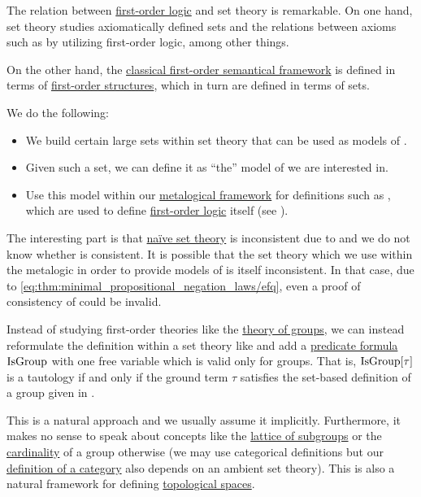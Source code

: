 \begin{remark}\label{rem:set_definition_recursion}
  The relation between \hyperref[subsec:first_order_logic]{first-order logic} and set theory is remarkable. On one hand, set theory studies axiomatically defined sets and the relations between axioms such as \hyperref[def:zfc]{} by utilizing first-order logic, among other things.

  On the other hand, the \hyperref[def:first_order_semantics]{classical first-order semantical framework} is defined in terms of \hyperref[def:first_order_structure]{first-order structures}, which in turn are defined in terms of sets.

  We do the following:
  \begin{itemize}
    \item We build certain large sets within set theory that can be used as models of .
    \item Given such a set, we can define it as \enquote{the} model of  we are interested in.
    \item Use this model within our \hyperref[rem:metalogic]{metalogical framework} for definitions such as , which are used to define \hyperref[subsec:first_order_logic]{first-order logic} itself (see ).
  \end{itemize}

  The interesting part is that \hyperref[def:naive_set_theory]{na\"ive set theory} is inconsistent due to  and we do not know whether \hyperref[def:zfc]{} is consistent. It is possible that the set theory which we use within the metalogic in order to provide models of  is itself inconsistent. In that case, due to \eqref{eq:thm:minimal_propositional_negation_laws/efq}, even a proof of consistency of  could be invalid.
\end{remark}

\begin{remark}\label{rem:first_order_theories_in_zfc}
  Instead of studying first-order theories like the \hyperref[def:group/theory]{theory of groups}, we can instead reformulate the definition within a set theory like \hyperref[def:zfc]{} and add a \hyperref[rem:predicate_formula]{predicate formula} \( \operatorname{IsGroup} \) with one free variable which is valid only for groups. That is, \( \operatorname{IsGroup}[\tau] \) is a tautology if and only if the ground term \( \tau \) satisfies the set-based definition of a group given in .

  This is a natural approach and we usually assume it implicitly. Furthermore, it makes no sense to speak about concepts like the \hyperref[thm:substructures_form_complete_lattice]{lattice of subgroups} or the \hyperref[def:cardinal]{cardinality} of a group otherwise (we may use categorical definitions but our \hyperref[def:category]{definition of a category} also depends on an ambient set theory). This is also a natural framework for defining \hyperref[def:topological_space]{topological spaces}.
\end{remark}
